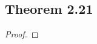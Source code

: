 \documentclass[../../main.tex]{subfiles}
\begin{document}
\subsection{Theorem 2.21}
\begin{wts}

\end{wts}
\begin{proof}

\end{proof}
\end{document}

